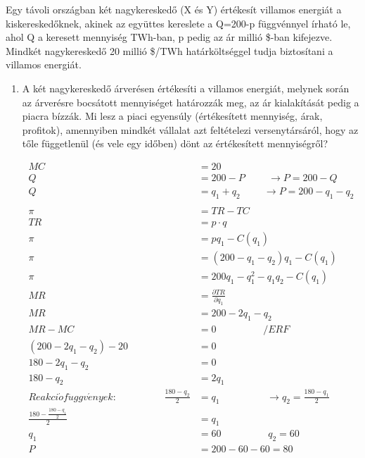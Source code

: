 \documentclass[10pt,a4paper]{article}
\begin{document}
Egy távoli országban két nagykereskedő (X és Y) értékesít villamos energiát a kiskereskedőknek, akinek az együttes kereslete a Q=200-p függvénnyel írható le, ahol Q a keresett mennyiség TWh-ban, p pedig az ár millió \$-ban kifejezve. Mindkét nagykereskedő 20 millió \$/TWh határköltséggel tudja biztosítani a villamos energiát. 
\begin{enumerate}[label=(\alph*)]

\item A két nagykereskedő árverésen értékesíti a villamos energiát, melynek során az árverésre bocsátott mennyiséget határozzák meg, az ár kialakítását pedig a piacra bízzák. Mi lesz a piaci egyensúly (értékesített mennyiség, árak, profitok), amennyiben mindkét vállalat azt feltételezi versenytársáról, hogy az tőle függetlenül (és vele egy időben) dönt az értékesített mennyiségről?

\begin{align}
MC &= 20 	\nonumber\\
Q &= 200-P 	 \hspace{1cm}\rightarrow P = 200-Q \nonumber\\
Q &= q_1+q_2	\hspace{1cm}\rightarrow P = 200-q_1-q_2 \nonumber\\
\nonumber\\
\pi &= TR - TC \nonumber\\
TR &= p \cdot  q \nonumber\\
\pi &= pq_1-C(q_1)\nonumber\\
\pi &= (200-q_1-q_2)q_1-C(q_1) \\
\pi &= 200q_1-q_1^2-q_1q_2-C(q_1) \nonumber\\
MR &= \frac{\partial TR}{\partial q_1} \nonumber\\
MR &= 200-2q_1-q_2 \nonumber\\
MR-MC &= 0  \hspace{2cm} /ERF\\
(200-2q_1-q_2)-20 &=0 \nonumber\\
180-2q_1-q_2 &= 0 \nonumber\\
180-q_2 &= 2q_1 \nonumber\\
Reakci\acute{o}f\ddot{u}ggv\acute{e}nyek:\hspace{2cm} \displaystyle\frac{180-q_2}{2} &= q_1 \hspace{2cm}\rightarrow  q_2=\displaystyle\frac{180-q_1}{2} 
\\
\frac{180-\frac{180-q_1}{2}}{2} &= q_1  \nonumber\\
q_1 &= 60 \hspace{2cm} q_2=60 \\
P &= 200-60-60 = 80 
\end{align}


\end{enumerate}
\end{document}
